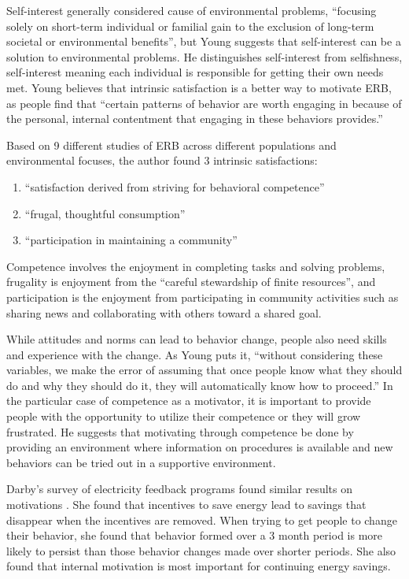 Self-interest generally considered cause of environmental problems, ``focusing 
solely on short-term individual or familial gain to the exclusion of long-term societal or environmental benefits'', but Young suggests that self-interest can be a solution to environmental problems. He distinguishes self-interest from selfishness, self-interest meaning each individual is responsible for getting their own needs met. Young believes that intrinsic satisfaction is a better way to motivate ERB, as people find that ``certain patterns of behavior are worth engaging in because of the personal, internal contentment that engaging in these behaviors provides.''

Based on 9 different studies of ERB across different populations and environmental focuses, the author found 3 intrinsic satisfactions:
\begin{enumerate}
	\item ``satisfaction derived from striving for behavioral competence''
	\item ``frugal, thoughtful consumption''
	\item ``participation in maintaining a community''
\end{enumerate}
Competence involves the enjoyment in completing tasks and solving problems, frugality is enjoyment from the ``careful stewardship of finite resources'', and 
participation is the enjoyment from participating in community activities such as sharing news and collaborating with others toward a shared goal.

While attitudes and norms can lead to behavior change, people also need skills and experience with the change. As Young puts it, ``without considering these variables, we make the error of assuming that once people know what they should do and why they should do it, they will automatically know how to proceed.'' In the particular case of competence as a motivator, it is important to provide people with the opportunity to utilize their competence or they will grow frustrated. He suggests that motivating through competence be done by providing an environment where information on procedures is available and new behaviors can be tried out in a supportive environment.

Darby's survey of electricity feedback programs found similar results on motivations \cite{darby-review-2006}. She found that incentives to save energy lead to savings that disappear when the incentives are removed. When trying to get people to change their behavior, she found that behavior formed over a 3 month period is more likely to persist than those behavior changes made over shorter periods. She also found that internal motivation is most important for continuing energy savings.


